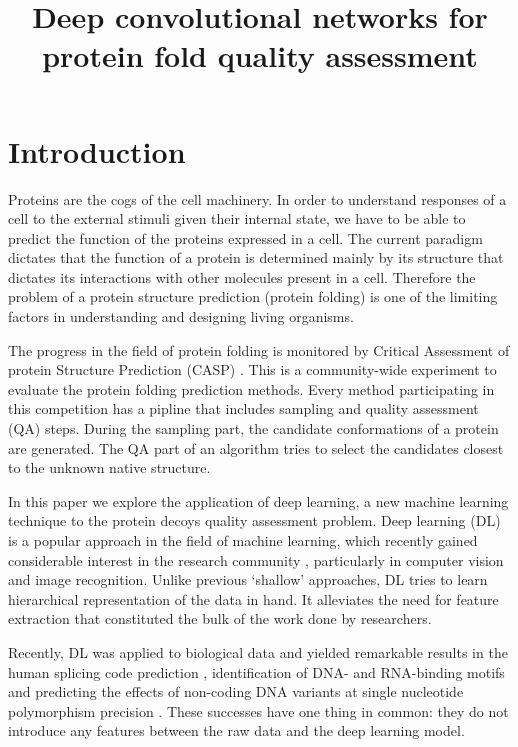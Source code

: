 \documentclass[a4paper,10pt]{article}
\title{Deep convolutional networks for protein fold quality assessment}
\author{}
\begin{document}
\maketitle

\begin{abstract}

\end{abstract}

\section{Introduction}
Proteins are the cogs of the cell machinery. In order to understand responses of a cell to the external stimuli given their internal state, we
have to be able to predict the function of the proteins expressed in a cell. The current paradigm dictates that the function 
of a protein is determined mainly by its structure that dictates its interactions with other molecules present in a cell. 
Therefore the problem of a protein structure prediction (protein folding) is one of the limiting factors in understanding and designing living
organisms.

The progress in the field of protein folding is monitored by Critical Assessment of protein Structure Prediction (CASP) \cite{moult1995large}. This 
is a community-wide experiment to evaluate the protein folding prediction methods. Every method participating in this competition has a pipline
that includes sampling and quality assessment (QA) steps. During the sampling part, the candidate conformations of a protein are generated. The 
QA part of an algorithm tries to select the candidates closest to the unknown native structure.

In this paper we explore the application of deep learning, a new machine learning technique to the protein decoys quality assessment problem. 
Deep learning (DL) is a popular  approach in the field of machine learning, which recently gained considerable interest 
in the research community \cite{lecun2015deep}, particularly in computer vision and image recognition. 
Unlike previous ‘shallow’ approaches, DL tries to learn hierarchical representation of the 
data in hand. It alleviates the need for feature extraction that constituted the bulk of the work done by researchers. 

Recently, DL was applied to biological data and yielded remarkable results in the human splicing code prediction \cite{xiong2015human}, 
identification of DNA- and RNA-binding  motifs \cite{alipanahi2015predicting} and predicting the effects of non-coding 
DNA variants at single nucleotide polymorphism 
precision \cite{zhou2015predicting}. These successes have one thing in common: they do not introduce any features 
between the raw data and the deep learning model. 
\end{document}
